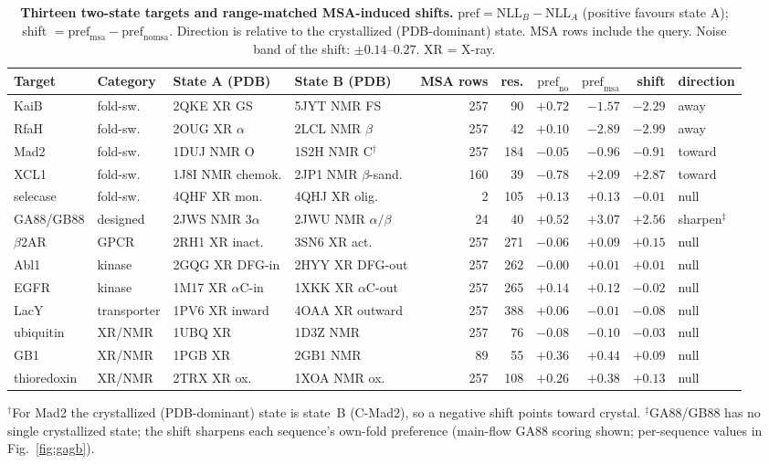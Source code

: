 \documentclass[11pt]{article}
\newcommand{\pref}{\mathrm{pref}}
\begin{document}
\begin{table}[t]
\centering
\caption{\textbf{Thirteen two-state targets and range-matched MSA-induced
shifts.} $\pref = \mathrm{NLL}_B - \mathrm{NLL}_A$ (positive favours state
A); shift $= \pref_{\mathrm{msa}} - \pref_{\mathrm{nomsa}}$. Direction is
relative to the crystallized (PDB-dominant) state. MSA rows include the
query. Noise band of the shift: $\pm 0.14$--$0.27$. XR = X-ray.}
\label{tab:targets}
\scriptsize
\setlength{\tabcolsep}{3.5pt}
\begin{tabular}{llllrrrrrl}
\toprule
Target & Category & State A (PDB) & State B (PDB) & MSA rows & res. &
$\pref_{\mathrm{no}}$ & $\pref_{\mathrm{msa}}$ & shift & direction \\
\midrule
KaiB & fold-sw. & 2QKE XR GS & 5JYT NMR FS & 257 & 90 & $+0.72$ & $-1.57$ & $-2.29$ & away \\
RfaH & fold-sw. & 2OUG XR $\alpha$ & 2LCL NMR $\beta$ & 257 & 42 & $+0.10$ & $-2.89$ & $-2.99$ & away \\
Mad2 & fold-sw. & 1DUJ NMR O & 1S2H NMR C$^{\dagger}$ & 257 & 184 & $-0.05$ & $-0.96$ & $-0.91$ & toward \\
XCL1 & fold-sw. & 1J8I NMR chemok. & 2JP1 NMR $\beta$-sand. & 160 & 39 & $-0.78$ & $+2.09$ & $+2.87$ & toward \\
selecase & fold-sw. & 4QHF XR mon. & 4QHJ XR olig. & 2 & 105 & $+0.13$ & $+0.13$ & $-0.01$ & null \\
GA88/GB88 & designed & 2JWS NMR 3$\alpha$ & 2JWU NMR $\alpha/\beta$ & 24 & 40 & $+0.52$ & $+3.07$ & $+2.56$ & sharpen$^{\ddagger}$ \\
$\beta$2AR & GPCR & 2RH1 XR inact. & 3SN6 XR act. & 257 & 271 & $-0.06$ & $+0.09$ & $+0.15$ & null \\
Abl1 & kinase & 2GQG XR DFG-in & 2HYY XR DFG-out & 257 & 262 & $-0.00$ & $+0.01$ & $+0.01$ & null \\
EGFR & kinase & 1M17 XR $\alpha$C-in & 1XKK XR $\alpha$C-out & 257 & 265 & $+0.14$ & $+0.12$ & $-0.02$ & null \\
LacY & transporter & 1PV6 XR inward & 4OAA XR outward & 257 & 388 & $+0.06$ & $-0.01$ & $-0.08$ & null \\
ubiquitin & XR/NMR & 1UBQ XR & 1D3Z NMR & 257 & 76 & $-0.08$ & $-0.10$ & $-0.03$ & null \\
GB1 & XR/NMR & 1PGB XR & 2GB1 NMR & 89 & 55 & $+0.36$ & $+0.44$ & $+0.09$ & null \\
thioredoxin & XR/NMR & 2TRX XR ox. & 1XOA NMR ox. & 257 & 108 & $+0.26$ & $+0.38$ & $+0.13$ & null \\
\bottomrule
\end{tabular}
\begin{flushleft}\footnotesize
$^{\dagger}$For Mad2 the crystallized (PDB-dominant) state is state~B
(C-Mad2), so a negative shift points toward crystal.
$^{\ddagger}$GA88/GB88 has no single crystallized state; the shift sharpens
each sequence's own-fold preference (main-flow GA88 scoring shown; per-sequence
values in Fig.~\ref{fig:gagb}).
\end{flushleft}
\end{table}
\end{document}
